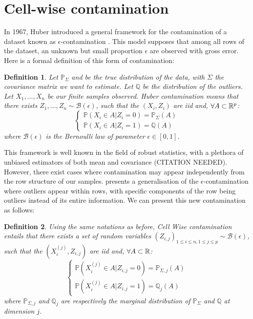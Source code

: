 \documentclass{article}
\newtheorem{definition}{Definition}
\numberwithin{equation}{section}
\begin{document}
\section{Cell-wise contamination}
    
    In 1967, Huber introduced a general framework for the contamination of a dataset known as $\epsilon$-contamination \cite{huberRobustEstimationLocation1964}. This model supposes that among all rows of the dataset, an unknown but small proportion $\epsilon$ are observed with gross error. Here is a formal definition of this form of contamination:
    \begin{definition}
    Let $\mathbb{P}_\Sigma$ and be the true distribution of the data, with $\Sigma$ the covariance matrix we want to estimate. Let $\mathbb{Q}$ be the distribution of the outliers. Let $X_1, \dots, X_n$ be our finite samples observed. Huber contamination means that there exists $Z_1, \dots, Z_n \sim \mathcal{B}(\epsilon)$, such that the $(X_i, Z_i)$ are iid and, $\forall A \subset \mathbb{R}^p$:
    \begin{equation}
        \begin{cases}
            \mathbb{P}(X_i \in A \vert Z_i = 0) = \mathbb{P}_\Sigma(A)\\
            \mathbb{P}(X_i \in A \vert Z_i = 1) = \mathbb{Q}(A)
        \end{cases}
    \end{equation}
    where $\mathcal{B}(\epsilon)$ is the Bernoulli law of parameter 
    $\epsilon \in [0,1]$.
    \end{definition}
    This framework is well known in the field of robust statistics, with a plethora of unbiased estimators of both mean and covariance (CITATION NEEDED). However, there exist cases where contamination may appear independently from the row structure of our samples. \cite{raymaekersHandlingCellwiseOutliers2020} presents a generalisation of the $\epsilon$-contamination where outliers appear within rows, with specific components of the row being outliers instead of its entire information. We can present this new contamination as follows:
    \begin{definition}
    Using the same notations as before, Cell Wise contamination entails that 
    there exists a set of random variables 
    $(Z_{i,j})_{1 \leq i \leq n, 1\leq j \leq p} \sim \mathcal{B}(\epsilon)$, 
    such that the $(X_i^{(j)}, Z_{i,j})$ are iid and, 
    $\forall A \subset \mathbb{R}$:
    \begin{equation}
        \begin{cases}
            \mathbb{P}(X_i^{(j)} \in A \vert Z_{i,j} = 0) = \mathbb{P}_{\Sigma, j}(A)\\
            \mathbb{P}(X_i^{(j)} \in A \vert Z_{i,j} = 1) = \mathbb{Q}_j(A)
        \end{cases}
    \end{equation}
    where $\mathbb{P}_{\Sigma, j}$ and $\mathbb{Q}_j$ are respectively the marginal distribution of $\mathbb{P}_\Sigma$ and $\mathbb{Q}$ at dimension $j$.
    \end{definition}
\end{document}
